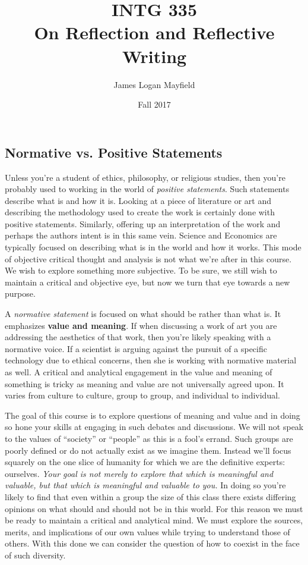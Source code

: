 \documentclass[nobib]{tufte-handout}
\title{INTG 335 \\ On Reflection and Reflective Writing}
\author{James Logan Mayfield }
\date{ Fall 2017 }
\begin{document}
\maketitle
\thispagestyle{empty}

\subsection*{Normative vs. Positive Statements}

Unless you're a student of ethics, philosophy, or religious studies, then you're probably used to working in the world of  \textit{positive statements}. Such statements describe what is and how it is.  Looking at a piece of literature or art and describing the methodology used to create the work is certainly done with positive statements. Similarly, offering up an interpretation of the work and perhaps the authors intent is in this same vein. Science and Economics are typically focused on describing what is in the world and how it works. This mode of objective critical thought and analysis is not what we're after in this course. We wish to explore something more subjective. To be sure, we still wish to maintain a critical and objective eye, but now we turn that eye towards a new purpose.

A \textit{normative statement} is focused on what should be rather than what is. It emphasizes \textbf{value and meaning}.  If when discussing a work of art you are addressing the aesthetics of that work, then you're likely speaking with a normative voice. If a scientist is arguing against the pursuit of a specific technology due to ethical concerns, then she is working with normative material as well. A critical and analytical engagement in the value and meaning  of something is tricky as meaning and value are not universally agreed upon. It varies from culture to culture, group to group, and individual to individual.

The goal of this course is to explore questions of meaning and value and in doing so hone your skills at engaging in such debates and discussions. We will not speak to the values of ``society'' or ``people'' as this is a fool's errand. Such groups are poorly defined or do not actually exist as we imagine them.  Instead we'll focus squarely on the one slice of humanity for which we are the definitive experts: ourselves. \textit{Your goal is not merely to explore that which is meaningful and valuable, but that which is meaningful and valuable to you.} In doing so you're likely to find that even within a group the size of this class there exists differing opinions on what should and should not be in this world. For this reason we must be ready to maintain a critical and analytical mind. We must explore the sources, merits, and implications of our own values while trying to understand those of others. With this done we can consider the question of how to coexist in the face of such diversity.
\end{document}
